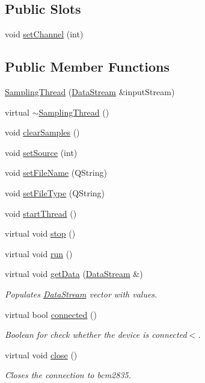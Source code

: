 \subsection*{Public Slots}
\begin{DoxyCompactItemize}
\item 
void \hyperlink{classSamplingThread_ad97231cf2bf7bbf0d1273b2076a18bab}{set\+Channel} (int)
\end{DoxyCompactItemize}
\subsection*{Public Member Functions}
\begin{DoxyCompactItemize}
\item 
\hyperlink{classSamplingThread_a0ba71431079dd2c80adee37f3e392d98}{Sampling\+Thread} (\hyperlink{classDataStream}{Data\+Stream} \&input\+Stream)
\item 
virtual \hyperlink{classSamplingThread_af1f6a9a930f6c9e3c2ecc3d3d1646373}{$\sim$\+Sampling\+Thread} ()
\item 
void \hyperlink{classSamplingThread_a55abdfd5263e59857dd3ef5c78489cf9}{clear\+Samples} ()
\item 
void \hyperlink{classSamplingThread_a3b186d0fbb2ff172593895ddb094f98d}{set\+Source} (int)
\item 
void \hyperlink{classSamplingThread_a3363a57aa7bc6a4f3867dafd1e35bd72}{set\+File\+Name} (Q\+String)
\item 
void \hyperlink{classSamplingThread_ade4c865b24840742b532a71208101f39}{set\+File\+Type} (Q\+String)
\item 
void \hyperlink{classSamplingThread_ab1284bf5429771100bf0a60ffe3aacef}{start\+Thread} ()
\item 
virtual void \hyperlink{classSamplingThread_a6e758c7b8266755c201ca002520f5e2e}{stop} ()
\item 
virtual void \hyperlink{classSamplingThread_a3145c2d8049b3f126f78cb1274154eeb}{run} ()
\item 
virtual void \hyperlink{classSamplingThread_aa52f1e7171ae5cb8432e949635b02d25}{get\+Data} (\hyperlink{classDataStream}{Data\+Stream} \&)
\begin{DoxyCompactList}\small\item\em Populates \hyperlink{classDataStream}{Data\+Stream} vector with values. \end{DoxyCompactList}\item 
virtual bool \hyperlink{classSamplingThread_a0770f5d1d0c0160cf023fae294010961}{connected} ()
\begin{DoxyCompactList}\small\item\em Boolean for check whether the device is connected$<$. \end{DoxyCompactList}\item 
virtual void \hyperlink{classSamplingThread_aade561b442e580b0ca4af112de2d7a41}{close} ()
\begin{DoxyCompactList}\small\item\em Closes the connection to bcm2835. \end{DoxyCompactList}\end{DoxyCompactItemize}

